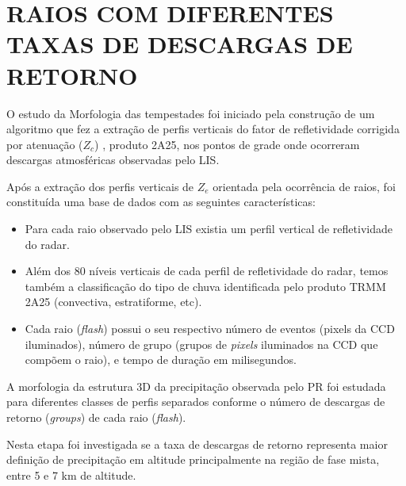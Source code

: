 \section{RAIOS COM DIFERENTES TAXAS DE DESCARGAS DE RETORNO}

O estudo da Morfologia das tempestades foi iniciado pela construção de um algoritmo que fez a extração de perfis verticais do fator de refletividade corrigida por atenuação ($Z_c$) , produto 2A25, nos pontos de grade onde ocorreram descargas atmosféricas observadas pelo LIS.


Após a extração dos perfis verticais de $Z_e$ orientada pela ocorrência de raios, foi constituída uma base de dados com as seguintes características:

\begin{itemize}
\item Para cada raio observado pelo LIS existia um perfil vertical de refletividade do radar.
\item Além dos 80 níveis verticais de cada perfil de refletividade do radar, temos também a classificação do tipo de chuva identificada pelo produto TRMM 2A25 (convectiva, estratiforme, etc).
\item Cada raio (\textit{flash}) possui o seu respectivo número de eventos (pixels da CCD iluminados), número de grupo (grupos de \textit{pixels} iluminados na CCD que compõem o raio), e tempo de duração em milisegundos. 
\end{itemize}

A morfologia da estrutura 3D da precipitação observada pelo PR foi estudada para diferentes classes de perfis separados conforme o número de descargas de retorno (\textit{groups}) de cada raio (\textit{flash}). 

Nesta etapa foi investigada se a taxa de descargas de retorno representa maior definição de precipitação em altitude principalmente na região de fase mista, entre 5 e 7 km de altitude. 

